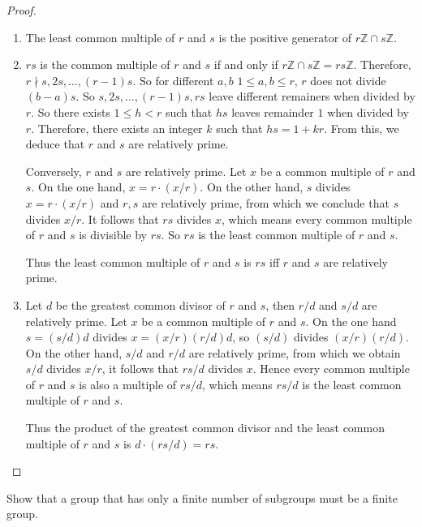 \begin{proof}
    \begin{enumerate}[label={\textbf{\alph*.}}]
        \item The least common multiple of $r$ and $s$ is the positive generator of $r\mathbb{Z}\cap s\mathbb{Z}$.
        \item $rs$ is the common multiple of $r$ and $s$ if and only if $r\mathbb{Z}\cap s\mathbb{Z} = rs\mathbb{Z}$. Therefore, $r \nmid s, 2s, \ldots, (r-1)s$. So for different $a, b$ $1\leq a, b \leq r$, $r$ does not divide $(b - a)s$. So $s, 2s, \ldots, (r-1)s, rs$ leave different remainers when divided by $r$. So there exists $1 \leq h < r$ such that $hs$ leaves remainder $1$ when divided by $r$. Therefore, there exists an integer $k$ such that $hs = 1 + kr$. From this, we deduce that $r$ and $s$ are relatively prime.

              Conversely, $r$ and $s$ are relatively prime. Let $x$ be a common multiple of $r$ and $s$. On the one hand, $x = r\cdot (x/r)$. On the other hand, $s$ divides $x = r\cdot (x/r)$ and $r, s$ are relatively prime, from which we conclude that $s$ divides $x/r$. It follows that $rs$ divides $x$, which means every common multiple of $r$ and $s$ is divisible by $rs$. So $rs$ is the least common multiple of $r$ and $s$.

              Thus the least common multiple of $r$ and $s$ is $rs$ iff $r$ and $s$ are relatively prime.
        \item Let $d$ be the greatest common divisor of $r$ and $s$, then $r/d$ and $s/d$ are relatively prime. Let $x$ be a common multiple of $r$ and $s$. On the one hand $s = (s/d)d$ divides $x = (x/r)(r/d)d$, so $(s/d)$ divides $(x/r)(r/d)$. On the other hand, $s/d$ and $r/d$ are relatively prime, from which we obtain $s/d$ divides $x/r$, it follows that $rs/d$ divides $x$. Hence every common multiple of $r$ and $s$ is also a multiple of $rs/d$, which means $rs/d$ is the least common multiple of $r$ and $s$.

              Thus the product of the greatest common divisor and the least common multiple of $r$ and $s$ is $d\cdot (rs/d) = rs$.
    \end{enumerate}
\end{proof}

\newpage
\begin{exercise}
    Show that a group that has only a finite number of subgroups must be a finite group.
\end{exercise}

